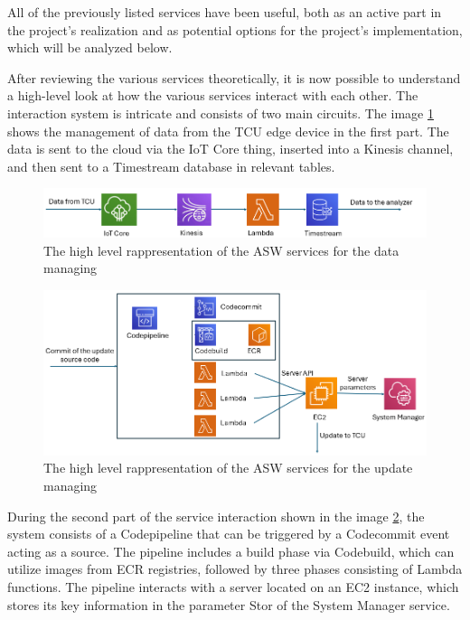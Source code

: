 All of the previously listed services have been useful, both as an active part in the project's realization and as potential options for the project's implementation, which will be analyzed below. 

After reviewing the various services theoretically, it is now possible to understand a high-level look at how the various services interact with each other.
The interaction system is intricate and consists of two main circuits. The image \ref{fig:AWSDataServices} shows the management of data from the TCU edge device in the first part. The data is sent to the cloud via the IoT Core thing, inserted into a Kinesis channel, and then sent to a Timestream database in relevant tables.
\begin{figure}[h]  %
    \centering
    \includegraphics[width=1\textwidth]{images/AWS_data_services.png}  %
    \caption{The high level rappresentation of the ASW services for the data managing}
    \label{fig:AWSDataServices}
\end{figure}

\begin{figure}[h]  %
    \centering
    \includegraphics[width=1\textwidth]{images/AWS_update_services.png}  %
    \caption{The high level rappresentation of the ASW services for the update managing}
    \label{fig:AWSUpdateServices}
\end{figure}
During the second part of the service interaction shown in the image \ref{fig:AWSUpdateServices}, the system consists of a Codepipeline that can be triggered by a Codecommit event acting as a source. The pipeline includes a build phase via Codebuild, which can utilize images from ECR registries, followed by three phases consisting of Lambda functions. The pipeline interacts with a server located on an EC2 instance, which stores its key information in the parameter Stor of the System Manager service.

